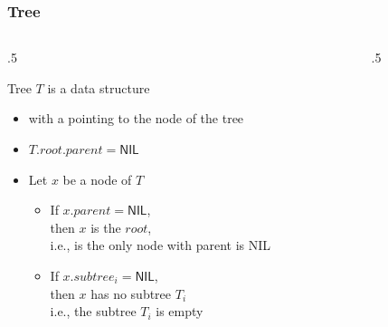 \documentclass[10pt]{beamer}
\begin{document}
\begin{frame}[t]\frametitle{Tree}
	\begin{columns}[T] %
	\begin{column}{.5\linewidth} %
		{\footnotesize 
	    	Tree $T$ is a data structure 
		\begin{itemize}
			\item
			with a  pointing to the  node of the tree
			
			\item
			 $T.root.parent = \mathsf{NIL}$
			
			\item
			Let $x$ be a node of $T$
			
			\begin{itemize}
				
				\item
				If $x.parent = \mathsf{NIL}$,\\
				then $x$ is the $root$,\\
				i.e.,  is the only node with parent is NIL
				
				\item 
				If $x.subtree_{i} = \mathsf{NIL}$,\\
				then $x$ has no subtree $T_{i}$ \\
				i.e., the subtree $T_{i}$ is empty
				
			\end{itemize}
			
		\end{itemize}
		
		
		} %

	\end{column} %
	\begin{column}{.5\linewidth} %
{\footnotesize 
		
		
} %

	\end{column} %
	\end{columns} %
\end{frame}
\end{document}
